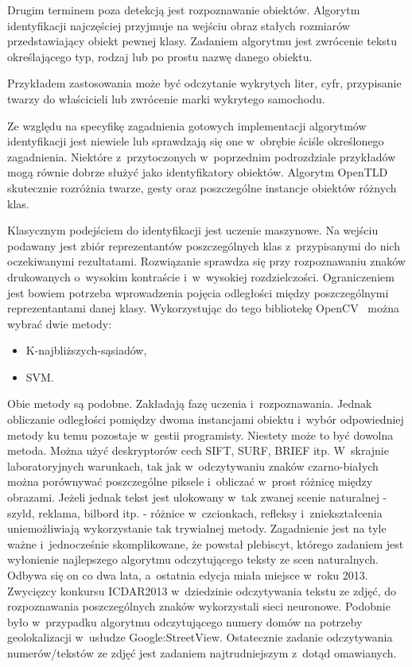 Drugim terminem poza detekcją jest rozpoznawanie obiektów. Algorytm
identyfikacji najczęściej przyjmuje na wejściu obraz stałych rozmiarów
przedstawiający obiekt pewnej klasy. Zadaniem algorytmu jest zwrócenie
tekstu określającego typ, rodzaj lub po prostu nazwę danego obiektu.

Przykładem zastosowania może być odczytanie wykrytych liter,
cyfr, przypisanie twarzy do właścicieli lub zwrócenie marki wykrytego
samochodu.

Ze względu na specyfikę zagadnienia gotowych implementacji algorytmów
identyfikacji jest niewiele lub sprawdzają się one w~obrębie
ściśle określonego zagadnienia. Niektóre z~przytoczonych w~poprzednim
podrozdziale przykładów mogą równie dobrze służyć jako identyfikatory
obiektów. Algorytm OpenTLD skutecznie rozróżnia twarze, gesty oraz
poszczególne instancje obiektów różnych klas.

Klasycznym podejściem do identyfikacji jest uczenie maszynowe. Na
wejściu podawany jest zbiór reprezentantów poszczególnych klas
z~przypisanymi do nich oczekiwanymi rezultatami. Rozwiązanie
sprawdza się przy rozpoznawaniu znaków drukowanych o~wysokim
kontraście i~w~wysokiej rozdzielczości. Ograniczeniem jest bowiem
potrzeba wprowadzenia pojęcia odległości między poszczególnymi
reprezentantami danej klasy. Wykorzystując do tego bibliotekę
OpenCV \ można wybrać dwie metody:

\begin{itemize}
\item K-najbliższych-sąsiadów,
\item SVM.
\end{itemize}

Obie metody są podobne. Zakładają fazę uczenia i~rozpoznawania.
Jednak obliczanie odległości pomiędzy dwoma instancjami obiektu
i~wybór odpowiedniej metody ku temu pozostaje w~gestii programisty.
Niestety może to być dowolna metoda. Można użyć deskryptorów cech
SIFT, SURF, BRIEF itp. W~skrajnie laboratoryjnych warunkach, tak
jak w~odczytywaniu znaków czarno-białych można porównywać poszczególne
piksele i~obliczać w~prost różnicę między obrazami. Jeżeli jednak tekst 
jest ulokowany w~tak zwanej scenie naturalnej -
szyld, reklama, bilbord itp. - różnice w~czcionkach, refleksy
i~zniekształcenia uniemożliwiają wykorzystanie tak trywialnej metody.
Zagadnienie jest na tyle ważne i~jednocześnie skomplikowane, że
powstał plebiscyt, którego zadaniem jest wyłonienie najlepszego
algorytmu odczytującego teksty ze scen naturalnych. Odbywa się
on co dwa lata, a~ostatnia edycja miała miejsce w~roku 2013.
Zwycięzcy konkursu ICDAR2013 w~dziedzinie odczytywania tekstu ze
zdjęć, do rozpoznawania poszczególnych znaków wykorzystali sieci neuronowe.
Podobnie było w~przypadku algorytmu odczytującego numery domów na potrzeby
geolokalizacji w~usłudze Google:StreetView. Ostatecznie zadanie
odczytywania numerów/tekstów ze zdjęć jest zadaniem najtrudniejszym
z~dotąd omawianych.

